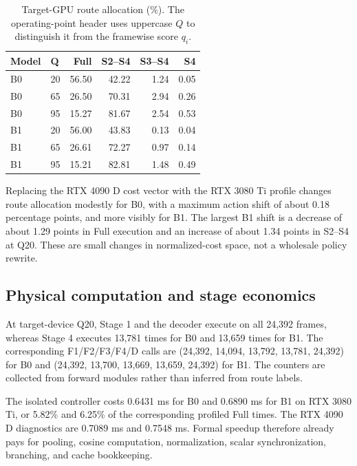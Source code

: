 \documentclass[runningheads]{llncs}
\begin{document}
\begin{table}[t]
\centering
\caption{Target-GPU route allocation (\%). The operating-point header uses uppercase $Q$ to distinguish it from the framewise score $q_i$.}
\label{tab:routes}
\small
\setlength{\tabcolsep}{3.2pt}
\begin{tabular}{llrrrr}
\toprule
Model & Q & Full & S2--S4 & S3--S4 & S4 \\
\midrule
B0 & 20 & 56.50 & 42.22 & 1.24 & 0.05 \\
B0 & 65 & 26.50 & 70.31 & 2.94 & 0.26 \\
B0 & 95 & 15.27 & 81.67 & 2.54 & 0.53 \\
B1 & 20 & 56.00 & 43.83 & 0.13 & 0.04 \\
B1 & 65 & 26.61 & 72.27 & 0.97 & 0.14 \\
B1 & 95 & 15.21 & 82.81 & 1.48 & 0.49 \\
\bottomrule
\end{tabular}
\end{table}

Replacing the RTX 4090 D cost vector with the RTX 3080 Ti profile changes route allocation modestly for B0, with a maximum action shift of about 0.18 percentage points, and more visibly for B1. The largest B1 shift is a decrease of about 1.29 points in Full execution and an increase of about 1.34 points in S2--S4 at Q20. These are small changes in normalized-cost space, not a wholesale policy rewrite.

\subsection{Physical computation and stage economics}
At target-device Q20, Stage 1 and the decoder execute on all 24,392 frames, whereas Stage 4 executes 13,781 times for B0 and 13,659 times for B1. The corresponding F1/F2/F3/F4/D calls are (24,392, 14,094, 13,792, 13,781, 24,392) for B0 and (24,392, 13,700, 13,669, 13,659, 24,392) for B1. The counters are collected from forward modules rather than inferred from route labels.

The isolated controller costs 0.6431 ms for B0 and 0.6890 ms for B1 on RTX 3080 Ti, or 5.82\% and 6.25\% of the corresponding profiled Full times. The RTX 4090 D diagnostics are 0.7089 ms and 0.7548 ms. Formal speedup therefore already pays for pooling, cosine computation, normalization, scalar synchronization, branching, and cache bookkeeping.
\end{document}

